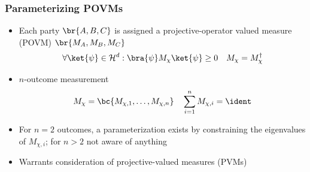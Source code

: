 \documentclass[
    hyperref={bookmarks=false},%
    xcolor={dvipsnames},
]{beamer}
\renewcommand{\term}[1]{\textcolor{Mahogany}{#1}}
\begin{document}
\begin{frame}
    \frametitle{Parameterizing POVMs}
    \begin{itemize}
        \item Each party $\br{A, B, C}$ is assigned a \term{projective-operator valued measure (POVM)} $\br{M_A, M_B, M_C}$
        \[ \forall \ket{\psi} \in \Hilb^d : \bra{\psi} M_\chi \ket{\psi} \geq 0 \quad M_\chi = M_\chi^{\dagger} \]
        \item $n$-outcome measurement
        \[ M_\chi = \bc{M_{\chi, 1}, \ldots, M_{\chi, n}} \quad \sum_{i=1}^{n} M_{\chi, i} = \ident \]
        \item For $n = 2$ outcomes, a parameterization exists by constraining the eigenvalues of $M_{\chi, i}$; for $n > 2$ not aware of anything
        \item Warrants consideration of \term{projective-valued measures (PVMs)}
    \end{itemize}
\end{frame}
\end{document}
